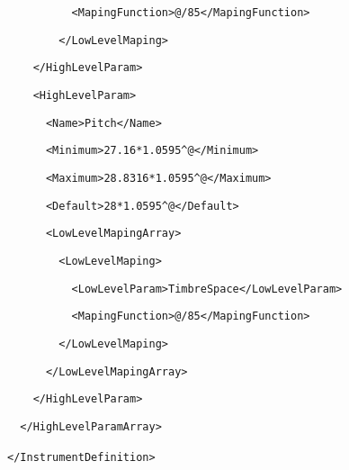 \documentclass[a4paper,english,american]{book}
\makeatletter
\def\preveqno{}\let\real@float=\@float \let\realend@float=\end@float
\def\@float{\let\@savefreelist\@freelist\real@float}
\def\end@float{\realend@float\global\let\@freelist\@savefreelist}
\def\lthtmltypeout#1{{\let\protect\string \immediate\write\lthtmlwrite{#1}}}%
\newcommand\lthtmlboxmathZ{\@next\next\@currlist{}{\def\next{\voidb@x}}%
 \expandafter\box\next\egroup}%
\newcommand\lthtmllogmath{\lthtmltypeout{l2hSize %
:\lthtmlmathenv:\the\ht\sizebox::\the\dp\sizebox::\the\wd\sizebox.\preveqno}}%
\newcommand\lthtmlfigureZ{\lthtmlboxmathZ\lthtmllogmath\copy\sizebox
       \global\let\@freelist\@savefreelist}%
\def\lthtmlcheckvsize{\ifdim\ht\sizebox<\vsize 
  \ifdim\wd\sizebox<\hsize\expandafter\hfill\fi \expandafter\vfill
  \else\expandafter\vss\fi}%
\makeatother
\begin{document}
{\begin{spacing}{0.8}
{}
\par
\texttt{\footnotesize ~~~~~~~~~~<MapingFunction>@/85</MapingFunction>}{\footnotesize\par
}
\par
\texttt{\footnotesize ~~~~~~~~</LowLevelMaping>}{\footnotesize\par
}
\par
\texttt{\footnotesize ~~~~</HighLevelParam>}{\footnotesize\par
}
\par
\texttt{\footnotesize ~~~~<HighLevelParam>}{\footnotesize\par
}
\par
\texttt{\footnotesize ~~~~~~<Name>Pitch</Name>}{\footnotesize\par
}
\par
\texttt{\footnotesize ~~~~~~<Minimum>27.16{*}1.0595\textasciicircum{}@</Minimum>}{\footnotesize\par
}
\par
\texttt{\footnotesize ~~~~~~<Maximum>28.8316{*}1.0595\textasciicircum{}@</Maximum>}{\footnotesize\par
}
\par
\texttt{\footnotesize ~~~~~~<Default>28{*}1.0595\textasciicircum{}@</Default>}{\footnotesize\par
}
\par
\texttt{\footnotesize ~~~~~~<LowLevelMapingArray>}{\footnotesize\par
}
\par
\texttt{\footnotesize ~~~~~~~~<LowLevelMaping>}{\footnotesize\par
}
\par
\texttt{\footnotesize ~~~~~~~~~~<LowLevelParam>TimbreSpace</LowLevelParam>}{\footnotesize\par
}
\par
\texttt{\footnotesize ~~~~~~~~~~<MapingFunction>@/85</MapingFunction>}{\footnotesize\par
}
\par
\texttt{\footnotesize ~~~~~~~~</LowLevelMaping>}{\footnotesize\par
}
\par
\texttt{\footnotesize ~~~~~~</LowLevelMapingArray>}{\footnotesize\par
}
\par
\texttt{\footnotesize ~~~~</HighLevelParam>}{\footnotesize\par
}
\par
\texttt{\footnotesize ~~</HighLevelParamArray>}{\footnotesize\par
}
\par
\texttt{\footnotesize </InstrumentDefinition>}~\\
\texttt{\footnotesize }~\\
{\footnotesize\par
}
\end{spacing}%
\lthtmlfigureZ
\lthtmlcheckvsize\clearpage}
\end{document}
